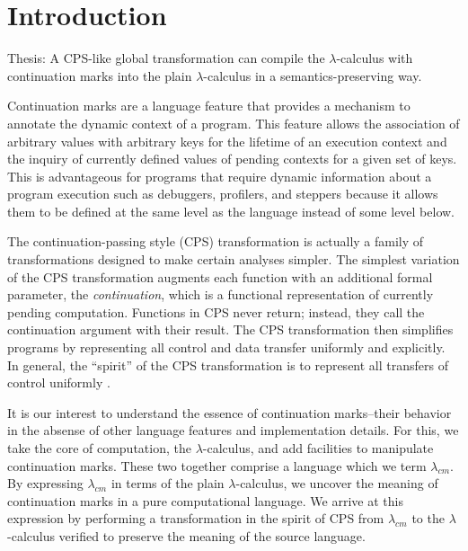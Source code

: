 \documentclass[ms]{byuprop}
\title{\Title}
\author{\Author}
\begin{document}
\maketitle



\section{Introduction}


Thesis: A CPS-like global transformation can compile the $\lambda$-calculus with
continuation marks into the plain $\lambda$-calculus in a semantics-preserving way.

Continuation marks \cite{clements2006portable} are a language feature that provides a
mechanism to annotate the dynamic context of a program. This feature allows the
association of arbitrary values with arbitrary keys for the lifetime of an execution
context and the inquiry of currently defined values of pending contexts for a given set of
keys. This is advantageous for programs that require dynamic information about a program
execution such as debuggers, profilers, and steppers because it allows them to be defined
at the same level as the language instead of some level below.

The continuation-passing style (CPS) transformation is actually a family of 
transformations designed to make certain analyses simpler. The simplest variation of the 
CPS transformation augments each function with an additional formal parameter, the 
\emph{continuation}, which is a functional representation of currently pending 
computation. Functions in CPS never return; instead, they call the continuation argument 
with their result. The CPS transformation then simplifies programs by representing all 
control and data transfer uniformly and explicitly. In general, the ``spirit'' of the 
CPS transformation is to represent all transfers of control uniformly \cite{sabry1994formal}.

It is our interest to understand the essence of continuation marks--their behavior in the 
absense of other language features and implementation details. For this, we take the core 
of computation, the $\lambda$-calculus, and add facilities to manipulate continuation 
marks. These two together comprise a language which we term $\lambda_{cm}$. By expressing 
$\lambda_{cm}$ in terms of the plain $\lambda$-calculus, we uncover the meaning of 
continuation marks in a pure computational language. We arrive at this expression by 
performing a transformation in the spirit of CPS from $\lambda_{cm}$ to the $\lambda$-calculus 
verified to preserve the meaning of the source language.
\end{document}
